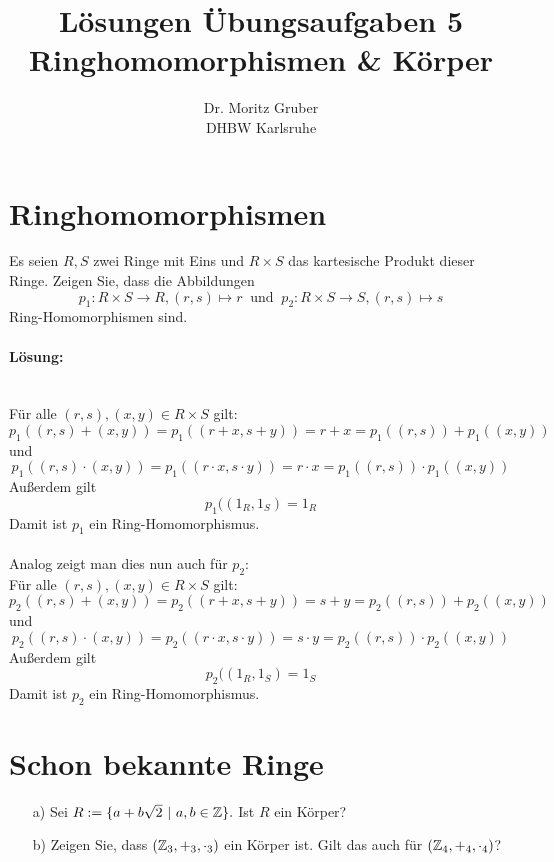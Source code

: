 \documentclass[
				a4paper,
				10pt
			]
			{scrartcl}
\author{Dr. Moritz Gruber\\ DHBW Karlsruhe}
\title{L\"osungen \"Ubungsaufgaben 5\\ 
	Ringhomomorphismen \& K\"orper
}
\date{}
\begin{document}
\maketitle

\section{Ringhomomorphismen}
Es seien $R,S$ zwei Ringe mit Eins und $R\times S$ das kartesische Produkt dieser Ringe. Zeigen Sie, dass die Abbildungen
		$$p_1 : R\times S \to R, (r,s) \mapsto r \ \text{ und } \ p_2 : R\times S \to S, (r,s) \mapsto s$$
Ring-Homomorphismen sind.
\paragraph{L\"osung:} \quad\\
F\"ur alle $(r,s),(x,y) \in R\times S$ gilt:\\
$$p_1((r,s)+(x,y))=p_1((r+x,s+y))=r+x=p_1((r,s))+p_1((x,y))$$
und
$$p_1((r,s)\cdot(x,y))=p_1((r\cdot x,s\cdot y))=r\cdot x=p_1((r,s))\cdot p_1((x,y))$$
Au\ss erdem gilt
$$
p_1((1_R,1_S)=1_R
$$
Damit ist $p_1$ ein Ring-Homomorphismus.\\
\quad\\
Analog zeigt man dies nun auch f\"ur $p_2$:\\
F\"ur alle $(r,s),(x,y) \in R\times S$ gilt:\\
$$p_2((r,s)+(x,y))=p_2((r+x,s+y))=s+y=p_2((r,s))+p_2((x,y))$$
und
$$p_2((r,s)\cdot(x,y))=p_2((r\cdot x,s\cdot y))=s\cdot y=p_2((r,s))\cdot p_2((x,y))$$
Au\ss erdem gilt
$$
p_2((1_R,1_S)=1_S
$$
Damit ist $p_2$ ein Ring-Homomorphismus.
\section{Schon bekannte Ringe}
\begin{itemize}
\item[a)] Sei
$
	R := \{ a + b\sqrt{2} ~|~a,b \in \mathbb{Z} \}. 
$
Ist $R$ ein K\"orper?
\item[b)]
Zeigen Sie, dass $(\mathbb{Z}_3,+_3,\cdot_3)$ ein K\"orper ist. Gilt das auch f\"ur $(\mathbb{Z}_4,+_4,\cdot_4)$?
\end{itemize}
\end{document}
